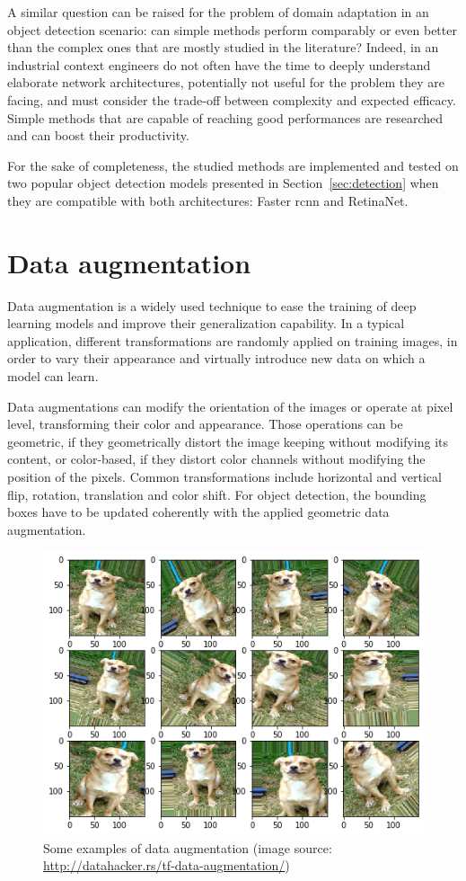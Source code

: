 \documentclass[%
    corpo=12pt,
    twoside,
    stile=classica,   
    tipotesi=magistrale,
    evenboxes,
    english
]{toptesi}
\begin{document}
A similar question can be raised for the problem of domain adaptation in an object detection scenario: can simple methods perform comparably or even better than the complex ones that are mostly studied in the literature? Indeed, in an industrial context engineers do not often have the time to deeply understand elaborate network architectures, potentially not useful for the problem they are facing, and must consider the trade-off between complexity and expected efficacy. Simple methods that are capable of reaching good performances are researched and can boost their productivity.

For the sake of completeness, the studied methods are implemented and tested on two popular object detection models presented in Section~\ref{sec:detection} when they are compatible with both architectures: Faster \gls{rcnn} and RetinaNet.

\section{Data augmentation}\label{sec:dataaug}
Data augmentation is a widely used technique to ease the training of deep learning models and improve their generalization capability. In a typical application, different transformations are randomly applied on training images, in order to vary their appearance and virtually introduce new data on which a model can learn.

Data augmentations can modify the orientation of the images or operate at pixel level, transforming their color and appearance. Those operations can be geometric, if they geometrically distort the image keeping without modifying its content, or color-based, if they distort color channels without modifying the position of the pixels. Common transformations include horizontal and vertical flip, rotation, translation and color shift. For object detection, the bounding boxes have to be updated coherently with the applied geometric data augmentation.

\begin{figure}[ht!]
	\centering
	\includegraphics[width=0.7\linewidth]{imgs/augmentation.png}
	\caption{Some examples of data augmentation (image source: \url{http://datahacker.rs/tf-data-augmentation/})}
	\label{fig:augmentation}
\end{figure}
\end{document}

